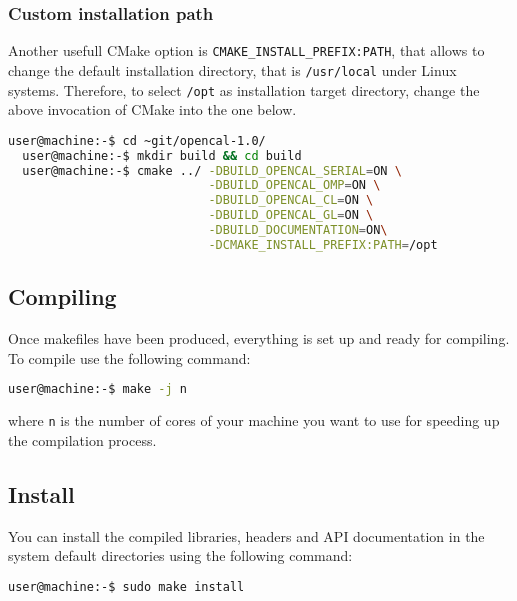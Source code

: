 \subsubsection{Custom installation path}

Another usefull CMake option is \texttt{CMAKE\_INSTALL\_PREFIX:PATH},
that allows to change the default installation directory, that is
\verb'/usr/local' under Linux systems. Therefore, to select
\texttt{/opt} as installation target directory, change the above
invocation of CMake into the one below.

\begin{lstlisting}[numbers=none,language=bash,label={ch:quickstart:simplebuild}]
  user@machine:-$ cd ~git/opencal-1.0/
  user@machine:-$ mkdir build && cd build
  user@machine:-$ cmake ../ -DBUILD_OPENCAL_SERIAL=ON \
                            -DBUILD_OPENCAL_OMP=ON \
                            -DBUILD_OPENCAL_CL=ON \
                            -DBUILD_OPENCAL_GL=ON \
                            -DBUILD_DOCUMENTATION=ON\
                            -DCMAKE_INSTALL_PREFIX:PATH=/opt
\end{lstlisting}



\subsection{Compiling}
Once makefiles have been produced, everything is set up and ready for
compiling. To compile use the following command:

\begin{lstlisting}[numbers=none,language=bash,label={ch:quickstart:ebuild}]
  user@machine:-$ make -j n
\end{lstlisting}
where \verb'n' is the number of cores of your machine you want to use
for speeding up the compilation process.

\subsection{Install}

You can install the compiled libraries, headers and API documentation
in the system default directories using the following command:

\begin{lstlisting}[numbers=none,language=bash,label={ch:quickstart:sudoinstall}]
  user@machine:-$ sudo make install
\end{lstlisting}


